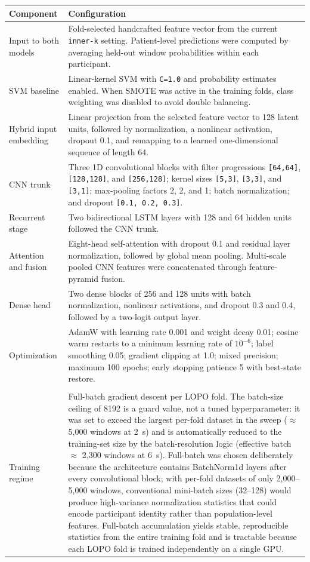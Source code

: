 \begin{tabularx}{\textwidth}{>{\raggedright\arraybackslash}p{}>{\raggedright\arraybackslash}X}
\toprule
Component & Configuration \\
\midrule
Input to both models & Fold-selected handcrafted feature vector from the current \texttt{inner-k} setting. Patient-level predictions were computed by averaging held-out window probabilities within each participant. \\
SVM baseline & Linear-kernel SVM with \texttt{C=1.0} and probability estimates enabled. When SMOTE was active in the training folds, class weighting was disabled to avoid double balancing. \\
Hybrid input embedding & Linear projection from the selected feature vector to 128 latent units, followed by normalization, a nonlinear activation, dropout 0.1, and remapping to a learned one-dimensional sequence of length 64. \\
CNN trunk & Three 1D convolutional blocks with filter progressions \texttt{[64,64]}, \texttt{[128,128]}, and \texttt{[256,128]}; kernel sizes \texttt{[5,3]}, \texttt{[3,3]}, and \texttt{[3,1]}; max-pooling factors 2, 2, and 1; batch normalization; and dropout \texttt{[0.1, 0.2, 0.3]}. \\
Recurrent stage & Two bidirectional LSTM layers with 128 and 64 hidden units followed the CNN trunk. \\
Attention and fusion & Eight-head self-attention with dropout 0.1 and residual layer normalization, followed by global mean pooling. Multi-scale pooled CNN features were concatenated through feature-pyramid fusion. \\
Dense head & Two dense blocks of 256 and 128 units with batch normalization, nonlinear activations, and dropout 0.3 and 0.4, followed by a two-logit output layer. \\
Optimization & AdamW with learning rate 0.001 and weight decay 0.01; cosine warm restarts to a minimum learning rate of $10^{-6}$; label smoothing 0.05; gradient clipping at 1.0; mixed precision; maximum 100 epochs; early stopping patience 5 with best-state restore. \\
\midrule
\multicolumn{2}{l}{\textbf{Training strategy and batch sizing}} \\
\addlinespace
Training regime & Full-batch gradient descent per LOPO fold. The batch-size ceiling of 8192 is a guard value, not a tuned hyperparameter: it was set to exceed the largest per-fold dataset in the sweep ($\approx$ 5,000 windows at 2~s) and is automatically reduced to the training-set size by the batch-resolution logic (effective batch $\approx$ 2,300 windows at 6~s). Full-batch was chosen deliberately because the architecture contains BatchNorm1d layers after every convolutional block; with per-fold datasets of only 2,000--5,000 windows, conventional mini-batch sizes (32--128) would produce high-variance normalization statistics that could encode participant identity rather than population-level features. Full-batch accumulation yields stable, reproducible statistics from the entire training fold and is tractable because each LOPO fold is trained independently on a single GPU. \\
\bottomrule
\end{tabularx}
